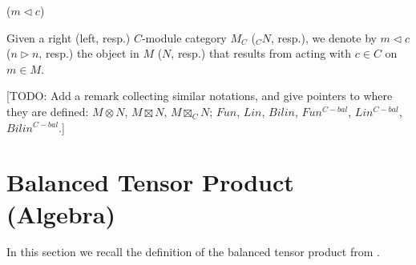 \begin{notation} ($m \lhd c$)

  Given a right (left, resp.) $C$-module category $M_C$ ($_{C}N$, resp.), we denote by $m\lhd c$ ($n \rhd n$, resp.) the object in $M$ ($N$, resp.) that results from acting with $c\in C$ on $m\in M$.
  \end{notation}

[TODO: Add a remark collecting similar notations, and give pointers to where they are defined: $M \otimes N$, $M \boxtimes N$, $M \boxtimes_{C} N$; $Fun$, $Lin$, $Bilin$, $Fun^{C-bal}$, $Lin^{C-bal}$,$Bilin^{C-bal}$.]





\section{Balanced Tensor Product (Algebra)}\label{section/balanced-tensor-product}

\noindent In this section we recall the definition of the balanced tensor product
from \cite{douglas/balanced-product}.

